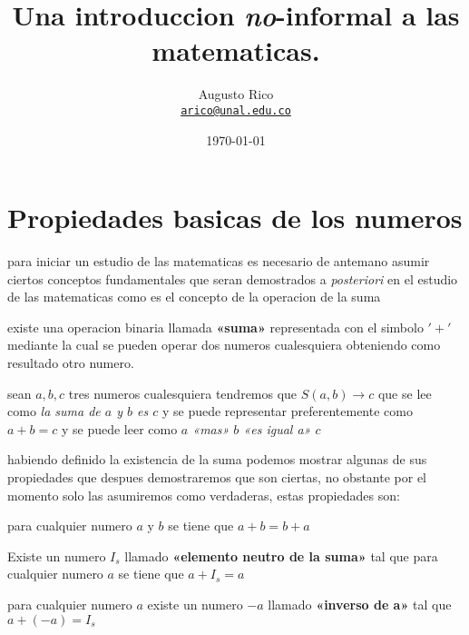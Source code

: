 \documentclass[11pt]{article}
\title{Una introduccion \textit{no}-informal a las matematicas.
}
\author{Augusto Rico\\%
    \href{mailto:arico@unal.edu.co}{\texttt{arico@unal.edu.co}} %
    }
\date{\today}
\begin{document}
\maketitle

\section{Propiedades basicas de los numeros}
\begin{flushleft}
    para iniciar un estudio de las matematicas es necesario de antemano asumir ciertos conceptos fundamentales
    que seran demostrados a \textit{posteriori} en el estudio de las matematicas como es el concepto de la operacion de la suma
    \begin{definition}
        existe una operacion binaria llamada \textbf{«suma»} representada con el simbolo $'+'$ mediante la cual se pueden operar dos numeros
        cualesquiera obteniendo como resultado otro numero.
    \end{definition}
    \begin{example}
        sean $a,b,c$ tres numeros cualesquiera tendremos que $S(a,b) \to c$ que se lee como 
        \textit{la suma de $a$ y $b$ es $c$} y se puede representar preferentemente como $a+b=c$
        y se puede leer como \textit{ $a$ «mas» $b$ «es igual a»  $c$}
    \end{example}
    habiendo definido la existencia de la suma podemos mostrar algunas de sus propiedades que despues demostraremos que son ciertas,
    no obstante por el momento solo las asumiremos como verdaderas, estas propiedades son:
    \begin{dogma}
        para cualquier numero $a$ y $b$ se tiene que $a+b=b+a$
    \end{dogma}
    \begin{dogma}
        Existe un numero $I_s$ llamado \textbf{«elemento neutro de la suma»} tal que para cualquier numero $a$ se tiene que $a+I_s=a$
    \end{dogma}
    \begin{dogma}
        para cualquier numero $a$ existe un numero $-a$ llamado \textbf{«inverso de a»} tal que $a+(-a)=I_s$

\end{dogma}
\end{flushleft}
\end{document}
